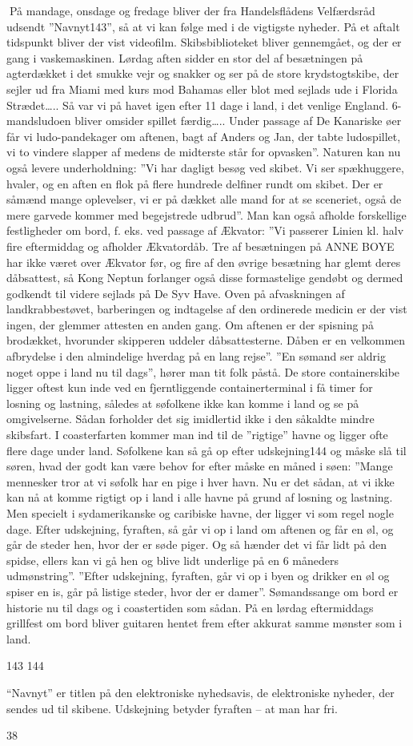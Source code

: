 På mandage, onsdage og fredage bliver der fra Handelsflådens
Velfærdsråd udsendt ''Navnyt143'', så at vi kan følge med i de vigtigste
nyheder. På et aftalt tidspunkt bliver der vist videofilm.
Skibsbiblioteket bliver gennemgået, og der er gang i vaskemaskinen.
Lørdag aften sidder en stor del af besætningen på agterdækket i det
smukke vejr og snakker og ser på de store krydstogtskibe, der sejler ud
fra Miami med kurs mod Bahamas eller blot med sejlads ude i Florida
Strædet\ldots{}.. Så var vi på havet igen efter 11 dage i land, i det
venlige England. 6-mandsludoen bliver omsider spillet færdig\ldots{}..
Under passage af De Kanariske øer får vi ludo-pandekager om aftenen,
bagt af Anders og Jan, der tabte ludospillet, vi to vindere slapper af
medens de midterste står for opvasken''. Naturen kan nu også levere
underholdning: ''Vi har dagligt besøg ved skibet. Vi ser spækhuggere,
hvaler, og en aften en flok på flere hundrede delfiner rundt om skibet.
Der er såmænd mange oplevelser, vi er på dækket alle mand for at se
sceneriet, også de mere garvede kommer med begejstrede udbrud''. Man kan
også afholde forskellige festligheder om bord, f. eks. ved passage af
Ækvator: ''Vi passerer Linien kl. halv fire eftermiddag og afholder
Ækvatordåb. Tre af besætningen på ANNE BOYE har ikke været over Ækvator
før, og fire af den øvrige besætning har glemt deres dåbsattest, så Kong
Neptun forlanger også disse formastelige gendøbt og dermed godkendt til
videre sejlads på De Syv Have. Oven på afvaskningen af landkrabbestøvet,
barberingen og indtagelse af den ordinerede medicin er der vist ingen,
der glemmer attesten en anden gang. Om aftenen er der spisning på
brodækket, hvorunder skipperen uddeler dåbsattesterne. Dåben er en
velkommen afbrydelse i den almindelige hverdag på en lang rejse''. ''En
sømand ser aldrig noget oppe i land nu til dags'', hører man tit folk
påstå. De store containerskibe ligger oftest kun inde ved en
fjerntliggende containerterminal i få timer for losning og lastning,
således at søfolkene ikke kan komme i land og se på omgivelserne. Sådan
forholder det sig imidlertid ikke i den såkaldte mindre skibsfart. I
coasterfarten kommer man ind til de ''rigtige'' havne og ligger ofte
flere dage under land. Søfolkene kan så gå op efter udskejning144 og
måske slå til søren, hvad der godt kan være behov for efter måske en
måned i søen: ''Mange mennesker tror at vi søfolk har en pige i hver
havn. Nu er det sådan, at vi ikke kan nå at komme rigtigt op i land i
alle havne på grund af losning og lastning. Men specielt i
sydamerikanske og caribiske havne, der ligger vi som regel nogle dage.
Efter udskejning, fyraften, så går vi op i land om aftenen og får en øl,
og går de steder hen, hvor der er søde piger. Og så hænder det vi får
lidt på den spidse, ellers kan vi gå hen og blive lidt underlige på en 6
måneders udmønstring''. ''Efter udskejning, fyraften, går vi op i byen
og drikker en øl og spiser en is, går på listige steder, hvor der er
damer''. Sømandssange om bord er historie nu til dags og i coastertiden
som sådan. På en lørdag eftermiddags grillfest om bord bliver guitaren
hentet frem efter akkurat samme mønster som i land.

143 144

``Navnyt'' er titlen på den elektroniske nyhedsavis, de elektroniske
nyheder, der sendes ud til skibene. Udskejning betyder fyraften -- at
man har fri.

38
